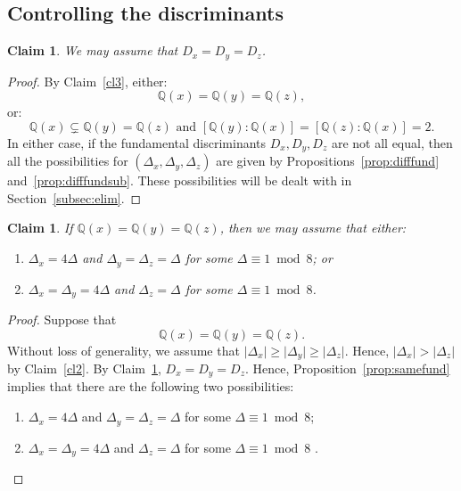 \documentclass[11pt,a4paper, british]{amsart}
\newtheorem{claim}[thm]{Claim}
\theoremstyle{definition}
\theoremstyle{remark}
\numberwithin{equation}{section}
\newcommand{\Q}{\mathbb{Q}} %
\begin{document}
\subsection{Controlling the discriminants}\label{subsec:disc}

\begin{claim}\label{cl7}
	We may assume that $D_x = D_y = D_z$.
\end{claim}

\begin{proof}
	By Claim~\ref{cl3}, either:
	\[ \Q(x) = \Q(y) = \Q(z),\]
	or:
	\[ \Q(x) \subsetneq \Q(y) = \Q(z) \mbox{ and } [\Q(y) : \Q(x)] = [\Q(z) : \Q(x)] = 2.\]
	In either case, if the fundamental discriminants $D_x, D_y, D_z$ are not all equal, then all the possibilities for $(\Delta_x, \Delta_y, \Delta_z)$ are given by Propositions~\ref{prop:difffund} and~\ref{prop:difffundsub}. These possibilities will be dealt with in Section~\ref{subsec:elim}.
\end{proof}



\begin{claim}\label{cl8}
	If $\Q(x) = \Q(y) = \Q(z)$, then we may assume that either:
	\begin{enumerate}
		\item $\Delta_x = 4 \Delta$ and $\Delta_y = \Delta_z = \Delta$ for some $\Delta \equiv 1 \bmod 8$; or
		\item $\Delta_x = \Delta_y = 4 \Delta$ and $\Delta_z = \Delta$ for some $\Delta \equiv 1 \bmod 8$.
	\end{enumerate}
\end{claim}

\begin{proof}
	Suppose that
	\[ \Q(x) = \Q(y) = \Q(z).\]
	Without loss of generality, we assume that $\lvert \Delta_x \rvert \geq \lvert \Delta_y \rvert \geq \lvert \Delta_z \rvert$. Hence, $\lvert \Delta_x \rvert > \lvert \Delta_z \rvert$ by Claim~\ref{cl2}. By Claim~\ref{cl7}, $D_x = D_y = D_z$. Hence, Proposition~\ref{prop:samefund} implies that there are the following two possibilities:
	\begin{enumerate}
		\item $\Delta_x = 4 \Delta$ and $\Delta_y = \Delta_z = \Delta$ for some $\Delta \equiv 1 \bmod 8$;
		\item $\Delta_x = \Delta_y = 4 \Delta$ and $\Delta_z = \Delta$ for some $\Delta \equiv 1 \bmod 8$ \qedhere.
	\end{enumerate}
\end{proof}
\end{document}

